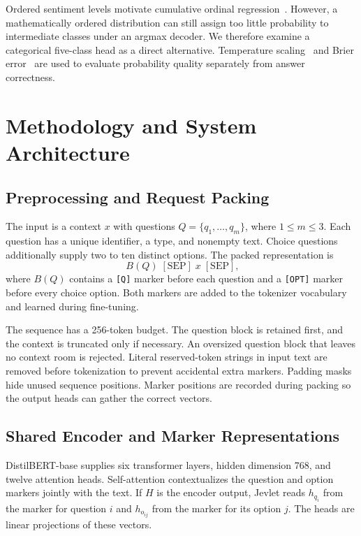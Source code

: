 \documentclass[conference]{IEEEtran}
\begin{document}
Ordered sentiment levels motivate cumulative ordinal regression~\cite{coral}. However, a mathematically ordered distribution can still assign too little probability to intermediate classes under an argmax decoder. We therefore examine a categorical five-class head as a direct alternative. Temperature scaling~\cite{guo} and Brier error~\cite{brier} are used to evaluate probability quality separately from answer correctness.

\section{Methodology and System Architecture}
\subsection{Preprocessing and Request Packing}
The input is a context $x$ with questions $Q=\{q_1,\ldots,q_m\}$, where $1\leq m\leq3$. Each question has a unique identifier, a type, and nonempty text. Choice questions additionally supply two to ten distinct options. The packed representation is
\begin{equation}
[\mathrm{CLS}]\;B(Q)\;[\mathrm{SEP}]\;x\;[\mathrm{SEP}],
\end{equation}
where $B(Q)$ contains a \texttt{[Q]} marker before each question and a \texttt{[OPT]} marker before every choice option. Both markers are added to the tokenizer vocabulary and learned during fine-tuning.

The sequence has a 256-token budget. The question block is retained first, and the context is truncated only if necessary. An oversized question block that leaves no context room is rejected. Literal reserved-token strings in input text are removed before tokenization to prevent accidental extra markers. Padding masks hide unused sequence positions. Marker positions are recorded during packing so the output heads can gather the correct vectors.

\subsection{Shared Encoder and Marker Representations}
DistilBERT-base supplies six transformer layers, hidden dimension 768, and twelve attention heads. Self-attention contextualizes the question and option markers jointly with the text. If $H$ is the encoder output, Jevlet reads $h_{q_i}$ from the marker for question $i$ and $h_{o_{ij}}$ from the marker for its option $j$. The heads are linear projections of these vectors.
\end{document}
